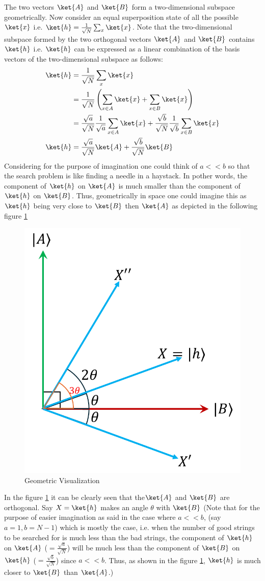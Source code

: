 \documentclass[12pt, oneside]{book}
\theoremstyle{definition}
\theoremstyle{definition}
\theoremstyle{remark}
\begin{document}
The two vectors $\ket{A}$ and $\ket{B}$ form a two-dimensional subspace geometrically. Now consider an equal superposition state of all the possible $\ket{x}$ i.e. $\ket{h}=\frac{1}{\sqrt{N}}\sum_x\ket{x}$. Note that the two-dimensional subspace formed by the two orthogonal vectors $\ket{A}$ and $\ket{B}$ contains $\ket{h}$ i.e. $\ket{h}$ can be expressed as a linear combination of the basis vectors of the two-dimensional subspace as follows:
\begin{align*}
\ket{h}&=\frac{1}{\sqrt{N}}\sum_x\ket{x}\\
&=\frac{1}{\sqrt{N}}\left(\sum_{x\in A}\ket{x}+\sum_{x\in B}\ket{x}\right)\\
&=\frac{\sqrt{a}}{\sqrt{N}}\frac{1}{\sqrt{a}}\sum_{x\in A}\ket{x} + \frac{\sqrt{b}}{\sqrt{N}}\frac{1}{\sqrt{b}}\sum_{x\in B}\ket{x}\\
\ket{h}&=\frac{\sqrt{a}}{\sqrt{N}}\ket{A}+\frac{\sqrt{b}}{\sqrt{N}}\ket{B}
\end{align*}
Considering for the purpose of imagination one could think of $a<<b$ so that the search problem is like finding a needle in a haystack. In pother words, the component of $\ket{h}$ on $\ket{A}$ is much smaller than the component of $\ket{h}$ on $\ket{B}$. Thus, geometrically in space one could imagine this as $\ket{h}$ being very close to $\ket{B}$ then $\ket{A}$ as depicted in the following figure \ref{fig:geometry}
\begin{figure}[H]
    \centering
    \includegraphics[width=0.5\linewidth]{../images/grover.png}
    \caption{Geometric Visualization}
    \label{fig:geometry}
\end{figure}
In the figure \ref{fig:geometry} it can be clearly seen that the$\ket{A}$ and $\ket{B}$ are orthogonal. Say $X=\ket{h}$ makes an angle $\theta$ with $\ket{B}$ (Note that for the purpose of easier imagination as said in the case where $a<<b$, (say $a=1, b=N-1$) which is mostly the case, i.e. when the number of good strings to be searched for is much less than the bad strings, the component of $\ket{h}$ on $\ket{A}$ ($=\frac{\sqrt{a}}{\sqrt{N}}$) will be much less than the component of $\ket{B}$ on $\ket{h}$ ($=\frac{\sqrt{b}}{\sqrt{N}}$) since $a<<b$. Thus, as shown in the figure \ref{fig:geometry}, $\ket{h}$ is much closer to $\ket{B}$ than $\ket{A}$.) 
\end{document}
